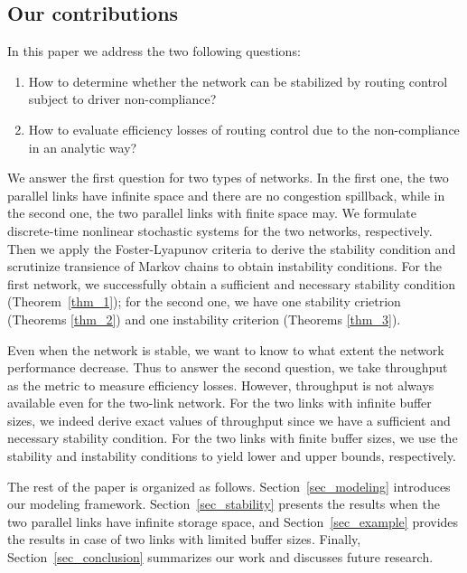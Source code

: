 \subsection{Our contributions}

In this paper we address the two following questions:
\begin{enumerate}
    \item How to determine whether the network can be stabilized by routing control subject to driver non-compliance?
    \item How to evaluate efficiency losses of routing control due to the non-compliance in an analytic way?
\end{enumerate}

We answer the first question for two types of networks. In the first one, the two parallel links have infinite space and there are no congestion spillback, while in the second one, the two parallel links with finite space may. We formulate discrete-time nonlinear stochastic systems for the two networks, respectively. Then we apply the Foster-Lyapunov criteria \cite{meyn2012markov} to derive the stability condition and scrutinize transience of Markov chains \cite{meyn2012markov,meyn1993survey} to obtain instability conditions. For the first network, we successfully obtain a sufficient and necessary stability condition (Theorem~\ref{thm_1}); for the second one, we have one stability crietrion (Theorems \ref{thm_2}) and one instability criterion (Theorems \ref{thm_3}). 

Even when the network is stable, we want to know to what extent the network performance decrease. Thus to answer the second question, we take throughput as the metric to measure efficiency losses. However, throughput is not always available even for the two-link network. For the two links with infinite buffer sizes, we indeed derive exact values of throughput since we have a sufficient and necessary stability condition. For the two links with finite buffer sizes, we use the stability and instability conditions to yield lower and upper bounds, respectively.  

The rest of the paper is organized as follows. Section~\ref{sec_modeling} introduces our modeling framework.
Section~\ref{sec_stability} presents the results when the two parallel links have infinite storage space, and Section~\ref{sec_example} provides the results in case of two links with limited buffer sizes. Finally, Section~\ref{sec_conclusion} summarizes our work and discusses future research.

